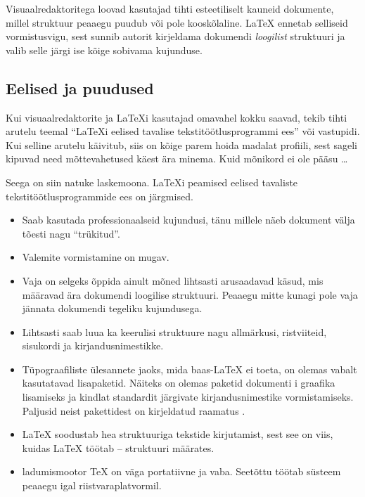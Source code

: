 Visuaalredaktoritega loovad kasutajad tihti
esteetiliselt kauneid dokumente, millel struktuur peaaegu puudub või
pole kooskõlaline. \LaTeX{} ennetab selliseid vormistusvigu, sest sunnib
autorit kirjeldama dokumendi \emph{loogilist} struktuuri ja valib selle
järgi ise kõige sobivama kujunduse.

\subsection{Eelised ja puudused}

Kui visuaalredaktorite ja \LaTeX i kasutajad omavahel kokku saavad,
tekib tihti arutelu teemal "`\LaTeX i eelised tavalise tekstitöötlusprogrammi ees"' või
vastupidi. Kui selline arutelu käivitub, siis on kõige parem hoida
madalat profiili, sest sageli kipuvad need mõttevahetused käest ära
minema. Kuid mõnikord ei ole pääsu \ldots

Seega on siin natuke laskemoona. \LaTeX i peamised eelised tavaliste
tekstitöötlusprogrammide ees on järgmised.
\begin{itemize}
\item Saab kasutada professionaalseid kujundusi, tänu millele näeb
  dokument välja tõesti nagu "`trükitud"'.
\item Valemite vormistamine on mugav.
\item Vaja on selgeks õppida ainult mõned lihtsasti arusaadavad
  käsud, mis määravad ära dokumendi loogilise struktuuri. Peaaegu mitte
  kunagi pole vaja jännata dokumendi tegeliku kujundusega.
\item Lihtsasti saab luua ka keerulisi struktuure nagu allmärkusi,
  ristviiteid, sisukordi ja kirjandusnimestikke.
\item Tüpograafiliste ülesannete jaoks, mida baas-\LaTeX{} ei toeta, on
  olemas vabalt kasutatavad lisapaketid. Näiteks on olemas paketid
  dokumenti \PSi i graafika lisamiseks ja kindlat standardit järgivate
  kirjandusnimestike vormistamiseks. Paljusid neist pakettidest on
  kirjeldatud raamatus \companion.
\item \LaTeX{} soodustab hea struktuuriga tekstide kirjutamist, sest see
  on viis, kuidas \LaTeX{} töötab -- struktuuri määrates.
\item \LaTeXe{} ladumismootor \TeX{} on väga portatiivne ja vaba.
  Seetõttu töötab süsteem peaaegu igal riistvaraplatvormil.
%
%
\end{itemize}

